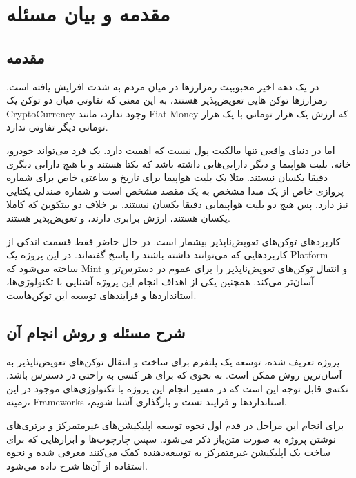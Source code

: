 
\chapter{مقدمه و بیان مسئله}

\section{مقدمه}
در یک دهه اخیر محبوبیت رمزارز‌ها در میان مردم به شدت افزایش یافته است.
رمزارزها توکن هایی تعویض‌پذیر هستند، به این معنی که تفاوتی میان دو توکن یک
\gls{CryptoCurrency}
وجود ندارد، مانند
\gls{Fiat Money}
که ارزش یک هزار تومانی با یک هزار تومانی دیگر تفاوتی ندارد.

اما در دنیای واقعی تنها مالکیت پول نیست که اهمیت دارد.
یک فرد می‌تواند خودرو، خانه، بلیت هواپیما و دیگر دارایی‌هایی داشته باشد که یکتا هستند و
با هیچ دارایی دیگری دقیقا یکسان نیستند.
مثلا یک بلیت هواپیما برای تاریخ و ساعتی خاص برای شماره پروازی خاص از یک مبدا مشخص به یک مقصد مشخص است و
شماره صندلی یکتایی نیز دارد.
پس هیچ دو بلیت هواپیمایی دقیقا یکسان نیستند.
بر خلاف دو بیتکوین که کاملا یکسان هستند، ارزش برابری دارند، و تعویض‌پذیر هستند.

کاربردهای توکن‌های تعویض‌ناپذیر بیشمار است.
در حال حاضر فقط قسمت اندکی از کاربردهایی که می‌توانند داشته باشند را پاسخ گفته‌اند.
در این پروژه یک
\gls{Platform}
ساخته می‌شود که
\gls{Mint}
و انتقال توکن‌های تعویض‌ناپذیر را برای عموم در دسترس‌تر و آسان‌تر می‌کند.
همچنین یکی از اهداف انجام این پروژه آشنایی با تکنولوژی‌ها، استاندارد‌ها و فرایند‌های توسعه این توکن‌هاست.


\section{شرح مسئله و روش انجام آن}
پروژه تعریف شده،
توسعه یک پلتفرم برای ساخت و انتقال توکن‌های تعویض‌ناپذیر به آسان‌ترین روش ممکن است.
به نحوی که برای هر کسی به راحتی در دسترس باشد.
نکته‌ی قابل توجه‌ این است که در مسیر انجام این پروژه با تکنولوژی‌های موجود در این زمینه، 
\glspl{Framework}
،استاندارد‌ها و فرایند تست و بارگذاری آشنا شویم.

برای انجام این مراحل در قدم اول نحوه توسعه اپلیکیشن‌های غیرمتمرکز و
برتری‌های نوشتن پروژه به صورت متن‌باز ذکر می‌شود.
سپس چارچوب‌ها و ابزار‌هایی که برای ساخت یک اپلیکیشن غیرمتمرکز به توسعه‌دهنده کمک می‌کنند معرفی شده
و نحوه استفاده از آن‌ها شرح داده می‌شود.

